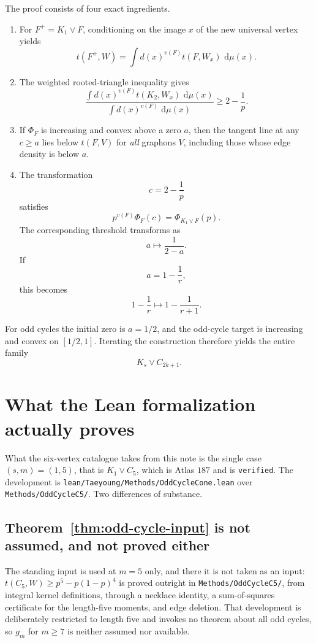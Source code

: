 \documentclass[11pt]{article}
\newcommand{\1}{\mathbf{1}}
\newcommand{\dd}{\,\mathrm{d}}
\newcommand{\join}{\vee}
\begin{document}
The proof consists of four exact ingredients.

\begin{enumerate}
\item
For $F^+=K_1\join F$, conditioning on the image $x$ of the new universal
vertex yields
\[
t(F^+,W)
=
\int d(x)^{v(F)}t(F,W_x)\,\dd\mu(x).
\]

\item
The weighted rooted-triangle inequality gives
\[
\frac{
\int d(x)^{v(F)}t(K_2,W_x)\,\dd\mu(x)
}{
\int d(x)^{v(F)}\,\dd\mu(x)
}
\ge
2-\frac1p.
\]

\item
If $\Phi_F$ is increasing and convex above a zero $a$, then the tangent
line at any $c\ge a$ lies below $t(F,V)$ for \emph{all} graphons $V$,
including those whose edge density is below $a$.

\item
The transformation
\[
c=2-\frac1p
\]
satisfies
\[
p^{v(F)}\Phi_F(c)
=
\Phi_{K_1\join F}(p).
\]
The corresponding threshold transforms as
\[
a\longmapsto \frac1{2-a}.
\]
If
\[
a=1-\frac1r,
\]
this becomes
\[
1-\frac1r
\longmapsto
1-\frac1{r+1}.
\]
\end{enumerate}

For odd cycles the initial zero is $a=1/2$, and the odd-cycle target
is increasing and convex on $[1/2,1]$.  Iterating the construction
therefore yields the entire family
\[
K_s\join C_{2k+1}.
\]

\appendix
\section{What the Lean formalization actually proves}

What the six-vertex catalogue takes from this note is the single case
$(s,m)=(1,5)$, that is $K_1\join C_5$, which is Atlas $187$ and is
\texttt{verified}.  The development is
\texttt{lean/Taeyoung/Methods/OddCycleCone.lean} over
\texttt{Methods/OddCycleC5/}.  Two differences of substance.

\subsection*{Theorem~\ref{thm:odd-cycle-input} is not assumed, and not proved
either}

The standing input is used at $m=5$ only, and there it is not taken as an
input: $t(C_5,W)\geq p^5-p(1-p)^4$ is proved outright in
\texttt{Methods/OddCycleC5/}, from integral kernel definitions, through a
necklace identity, a sum-of-squares certificate for the length-five moments,
and edge deletion.  That development is deliberately restricted to length five
and invokes no theorem about all odd cycles, so $g_m$ for $m\geq7$ is neither
assumed nor available.
\end{document}
